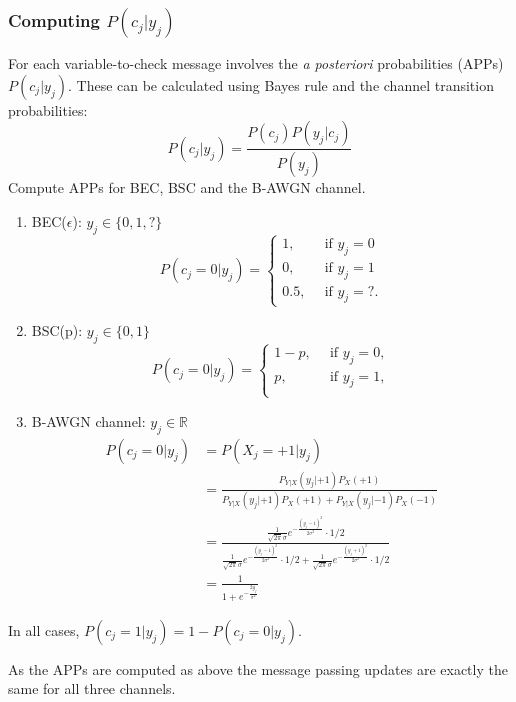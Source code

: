 \documentclass[12pt]{article}
\newcommand{\sigd}{\sigma^2}
\begin{document}
\subsubsection{Computing $P(c_j|y_j)$}
For each variable-to-check message involves the \textit{a posteriori} probabilities (APPs) $P(c_j|y_j)$. These can be calculated using Bayes rule and the channel transition probabilities:
\[
P(c_j|y_j)=\frac{P(c_j)P(y_j|c_j)}{P(y_j)}
\]
Compute APPs for BEC, BSC and the B-AWGN channel.
\begin{enumerate}
    \item BEC($\epsilon$): $y_j \in \{0,1,?\}$
    \[
    P(c_j=0|y_j) = \left \{\begin{array}{cc} 
        1, & \,\textrm{  if } y_j = 0 \\
        0, & \,\textrm{  if } y_j  = 1 \\
        0.5, &  \,\textrm{  if } y_j = ?.
    \end{array}
    \right.
    \]
    \item BSC(p): $y_j \in \{0,1 \}$
    \[
    P(c_j=0|y_j) = \left \{\begin{array}{cc} 
        1-p, & \,\textrm{  if } y_j = 0, \\
        p, & \,\textrm{  if } y_j  = 1, \\
    \end{array}
    \right.
    \]
    \item B-AWGN channel: $y_j \in \mathbb{R}$
    \begin{align*}
        P(c_j = 0 | y_j) &= P(X_j = +1|y_j)\\
        & = \frac{P_{Y|X}(y_j|+1)P_X(+1)}{P_{Y|X}(y_j|+1)P_X(+1) + P_{Y|X}(y_j|-1)P_X(-1)}\\
        & = \frac{\frac{1}{\sqrt{2\pi}\sigma}e^{-\frac{(y_j-1)^2}{2\sigd}} \cdot 1/2}{\frac{1}{\sqrt{2\pi}\sigma}e^{-\frac{(y_j-1)^2}{2\sigd}} \cdot 1/2 + \frac{1}{\sqrt{2\pi}\sigma}e^{-\frac{(y_j+1)^2}{2\sigd}} \cdot 1/2}\\
        & = \frac{1}{1 + e^{-\frac{2y_j}{\sigd}}}
    \end{align*}
\end{enumerate}
In all cases, $P(c_j = 1|y_j) = 1- P(c_j = 0| y_j)$.

As the APPs are computed as above the message passing updates are exactly the same for all three channels.
\end{document}
